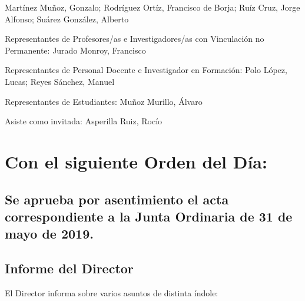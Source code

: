 \documentclass[numerado]{plantillasEPS} %
\begin{document}
\begin{asisten}
    Martínez Muñoz, Gonzalo; Rodríguez Ortíz, Francisco de Borja; Ruíz Cruz, Jorge Alfonso; Suárez González, Alberto
    \item[Representantes de Profesores/as e Investigadores/as con Vinculación no  Permanente:] Jurado Monroy, Francisco
    \item[Representantes de Personal Docente e Investigador en Formación:] Polo López, Lucas; Reyes Sánchez, Manuel
    \item[Representantes de Estudiantes:] Muñoz Murillo, Álvaro
    \item[Asiste como invitada:] Asperilla Ruiz, Rocío
\end{asisten}

\newpage

\chapter{Con el siguiente Orden del Día:}

\section{Se aprueba por asentimiento el acta correspondiente a la Junta Ordinaria de 31 de mayo de 2019.} 
\section{Informe del Director}
El Director informa sobre varios asuntos de distinta índole:
\end{document}
